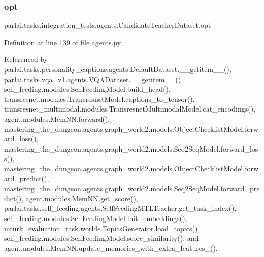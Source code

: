 \subsubsection{\texorpdfstring{opt}{opt}}
{\footnotesize\ttfamily parlai.\+tasks.\+integration\+\_\+tests.\+agents.\+Candidate\+Teacher\+Dataset.\+opt}



Definition at line 139 of file agents.\+py.



Referenced by parlai.\+tasks.\+personality\+\_\+captions.\+agents.\+Default\+Dataset.\+\_\+\+\_\+getitem\+\_\+\+\_\+(), parlai.\+tasks.\+vqa\+\_\+v1.\+agents.\+V\+Q\+A\+Dataset.\+\_\+\+\_\+getitem\+\_\+\+\_\+(), self\+\_\+feeding.\+modules.\+Self\+Feeding\+Model.\+build\+\_\+head(), transresnet.\+modules.\+Transresnet\+Model.\+captions\+\_\+to\+\_\+tensor(), transresnet\+\_\+multimodal.\+modules.\+Transresnet\+Multimodal\+Model.\+cat\+\_\+encodings(), agent.\+modules.\+Mem\+N\+N.\+forward(), mastering\+\_\+the\+\_\+dungeon.\+agents.\+graph\+\_\+world2.\+models.\+Object\+Checklist\+Model.\+forward\+\_\+loss(), mastering\+\_\+the\+\_\+dungeon.\+agents.\+graph\+\_\+world2.\+models.\+Seq2\+Seq\+Model.\+forward\+\_\+loss(), mastering\+\_\+the\+\_\+dungeon.\+agents.\+graph\+\_\+world2.\+models.\+Object\+Checklist\+Model.\+forward\+\_\+predict(), mastering\+\_\+the\+\_\+dungeon.\+agents.\+graph\+\_\+world2.\+models.\+Seq2\+Seq\+Model.\+forward\+\_\+predict(), agent.\+modules.\+Mem\+N\+N.\+get\+\_\+score(), parlai.\+tasks.\+self\+\_\+feeding.\+agents.\+Self\+Feeding\+M\+T\+L\+Teacher.\+get\+\_\+task\+\_\+index(), self\+\_\+feeding.\+modules.\+Self\+Feeding\+Model.\+init\+\_\+embeddings(), mturk\+\_\+evaluation\+\_\+task.\+worlds.\+Topics\+Generator.\+load\+\_\+topics(), self\+\_\+feeding.\+modules.\+Self\+Feeding\+Model.\+score\+\_\+similarity(), and agent.\+modules.\+Mem\+N\+N.\+update\+\_\+memories\+\_\+with\+\_\+extra\+\_\+features\+\_\+().

\mbox{\label{classparlai_1_1tasks_1_1integration__tests_1_1agents_1_1CandidateTeacherDataset_a04a3ef445fd67a46bdee89ce216c4e2b}} 
